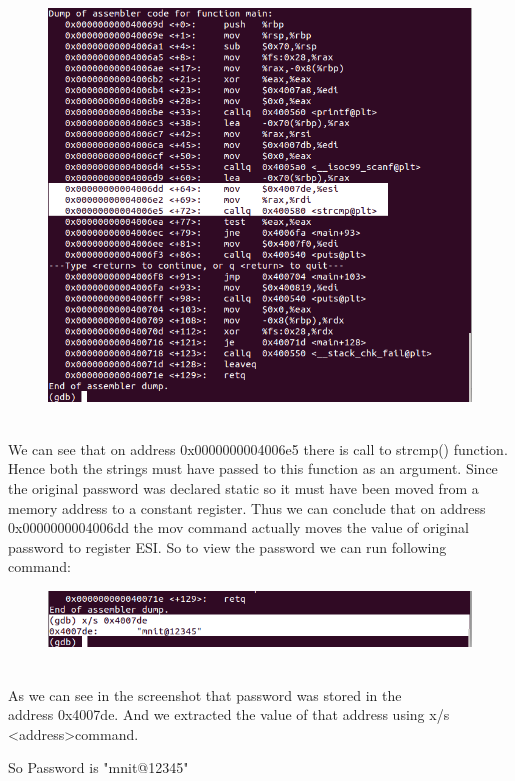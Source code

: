\documentclass[12pt]{article}
\begin{document}
\begin{figure}[ht!]
	\centering
	\includegraphics[width=120mm]{gdbcode.png}
	
\end{figure}
 \\  We can see that on address 0x0000000004006e5 there is call to strcmp() function. Hence both the strings must have passed to this function as an argument. Since the original password was declared static so it must have been moved from a memory address to a constant register.
 Thus we can conclude that on address 0x0000000004006dd the mov command actually moves the value of original password to register ESI.
 So to view the password we can run following command:
 
 \begin{figure}[ht!]
	\centering
	\includegraphics[width=120mm]{gdbcom.png}
	
\end{figure}
\\ As we can see in the screenshot that password was stored in the\\ address 0x4007de.
And we extracted the value of that address using x/s\\ \textless address\textgreater command.

So Password is "mnit@12345"
   
\end{document}
